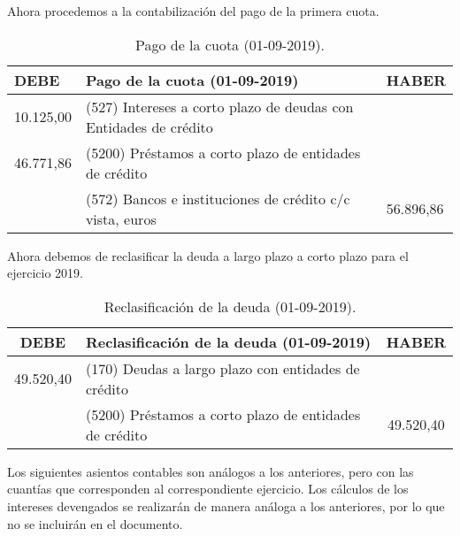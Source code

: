 Ahora procedemos a la contabilización del pago de la primera cuota. 

\begin{table}[H]
    \centering
    \begin{tabular}{|p{2cm}|p{6cm}|p{2cm}|}
        \hline
        \rowcolor{blue!30}
        \textbf{DEBE} & \textbf{Pago de la cuota (01-09-2019)} & \textbf{HABER} \\
        \hline
        10.125,00 & (527) Intereses a corto plazo de deudas con Entidades de crédito & \\
        \hline
        46.771,86 & (5200) Préstamos a corto plazo de entidades de crédito & \\
        \hline
        & (572) Bancos e instituciones de crédito c/c vista, euros & 56.896,86 \\
        \hline
    \end{tabular}
    \caption{Pago de la cuota (01-09-2019).}
    \label{tabla:pago_cuota_2019}
\end{table}

Ahora debemos de reclasificar la deuda a largo plazo a corto plazo para el ejercicio 2019.

\begin{table}[H]
    \centering
    \begin{tabular}{|c|p{6cm}|c|}
        \hline
        \rowcolor{blue!30}
        \textbf{DEBE} & \textbf{Reclasificación de la deuda (01-09-2019)} & \textbf{HABER} \\
        \hline
        49.520,40 & (170) Deudas a largo plazo con entidades de crédito & \\
        \hline
        & (5200) Préstamos a corto plazo de entidades de crédito & 49.520,40 \\
        \hline
    \end{tabular}
    \caption{Reclasificación de la deuda (01-09-2019).}
    \label{tabla:reclasificacion_deuda_2019}
\end{table}
\begin{tcolorbox}[colframe=yellow!30!black, colback=white, sharp corners=all, boxrule=0.5pt]
    Los siguientes asientos contables son análogos a los anteriores, pero con las cuantías que corresponden al correspondiente ejercicio. Los cálculos de los intereses devengados se realizarán de manera análoga a los anteriores, por lo que no se incluirán en el documento.
\end{tcolorbox}


